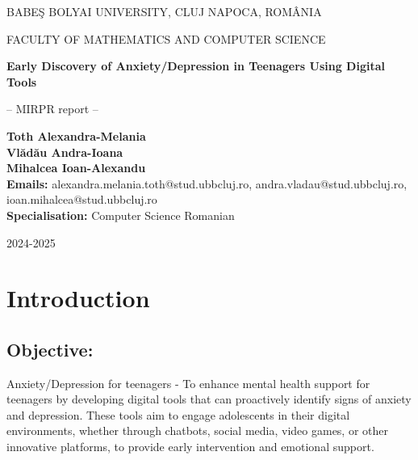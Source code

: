 \documentclass[runningheads,a4paper,11pt]{report}
\begin{document}
\begin{titlepage}
\sloppy

\begin{center}
BABE\c S BOLYAI UNIVERSITY, CLUJ NAPOCA, ROM\^ ANIA

FACULTY OF MATHEMATICS AND COMPUTER SCIENCE

\vspace{5cm}

\Huge \textbf{Early Discovery of Anxiety/Depression in Teenagers Using Digital Tools}

\vspace{1cm}

\normalsize -- MIRPR report --

\end{center}


\vspace{5cm}

\begin{flushright}
\Large{\textbf{Toth Alexandra-Melania \\ Vl\u{a}d\u{a}u Andra-Ioana \\ Mihalcea Ioan-Alexandu}}\\
\textbf {Emails: }
alexandra.melania.toth@stud.ubbcluj.ro, 
andra.vladau@stud.ubbcluj.ro, 
ioan.mihalcea@stud.ubbcluj.ro\\
\textbf{ Specialisation:} Computer Science Romanian
\end{flushright}

\vspace{2cm}

\begin{center}
2024-2025
\end{center}

\end{titlepage}


\tableofcontents

\newpage

\listoffigures

\newpage



\newpage



\chapter{Introduction}
\label{chapter:introduction}


\section{Objective:}
\label{section:objective}
Anxiety/Depression for teenagers - To enhance mental health support for teenagers by developing digital tools that can proactively identify signs of anxiety and depression. These tools aim to engage adolescents in their digital environments, whether through chatbots, social media, video games, or other innovative platforms, to provide early intervention and emotional support.
\end{document}
